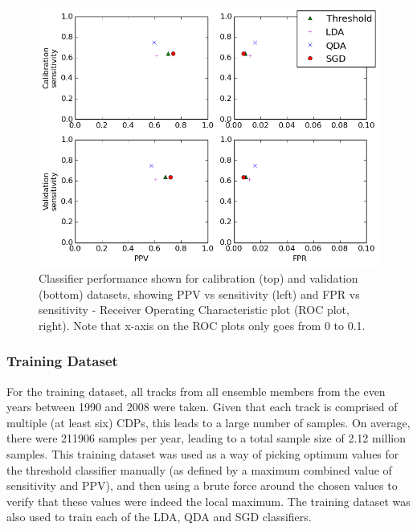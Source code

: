 \documentclass[pdftex,12pt,a4paper]{report}
\begin{document}

\begin{figure}[hb!]
    \centering
    \includegraphics[width=\textwidth]{figures/ppv_and_fpr_vs_sens}
    \caption{Classifier performance shown for calibration (top) and validation (bottom) datasets,
        showing PPV vs sensitivity (left) and FPR vs sensitivity - Receiver Operating Characteristic
        plot (ROC plot, right). Note that x-axis on the ROC plots only goes from 0 to 0.1. }
    \label{fig:ppv_and_fpr_vs_sens}
\end{figure}

\subsubsection{Training Dataset}
For the training dataset, all tracks from all ensemble members from the even years between 1990 and
2008 were taken. Given that each track is comprised of multiple (at least six) CDPs, this leads to a
large number of samples. On average, there were \SI{211906}{} samples per year, leading to a total
sample size of 2.12 million samples. This training dataset was used as a way of picking optimum
values for the threshold classifier manually (as defined by a maximum combined value of sensitivity
and PPV), and then using a brute force around the chosen values to verify that these values were
indeed the local maximum. The training dataset was also used to train each of the LDA, QDA and SGD
classifiers.
\end{document}
